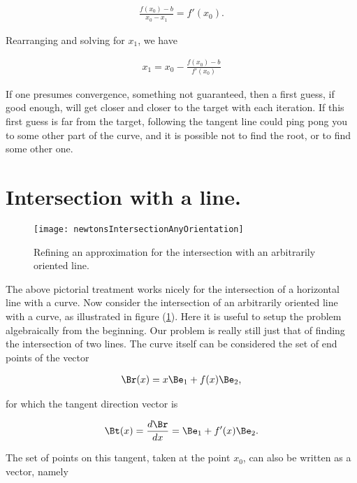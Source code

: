 \begin{align}\label{eqn:intersectionNewton:10}
\frac{f(x_0) - b}{x_0 - x_1} = f'(x_0).
\end{align}

Rearranging and solving for $x_1$, we have

\begin{align}\label{eqn:intersectionNewton:11}
x_1 = x_0 - \frac{f(x_0) - b}{f'(x_0)}
\end{align}

If one presumes convergence, something not guaranteed, then a first guess, if good enough, will get closer and closer to the target with each iteration.  If this first guess is far from the target, following the tangent line could ping pong you to some other part of the curve, and it is possible not to find the root, or to find some other one.

\section{Intersection with a line.}

\begin{figure}[htp]
\centering
\texttt{[image: newtonsIntersectionAnyOrientation]}
\caption{Refining an approximation for the intersection with an arbitrarily oriented line.}\label{fig:newtonsIntersectionAnyOrientation}
\end{figure}

The above pictorial treatment works nicely for the intersection of a horizontal line with a curve.  Now consider the intersection of an arbitrarily oriented line with a curve, as illustrated in figure (\ref{fig:newtonsIntersectionAnyOrientation}).  Here it is useful to setup the problem algebraically from the beginning.  Our problem is really still just that of finding the intersection of two lines.  The curve itself can be considered the set of end points of the vector

\begin{align}\label{eqn:intersectionNewton:20}
\Br(x) = x \Be_1 + f(x) \Be_2,
\end{align}

for which the tangent direction vector is 

\begin{align}\label{eqn:intersectionNewton:21}
\Bt(x) = \frac{d\Br}{dx} = \Be_1 + f'(x) \Be_2.
\end{align}

The set of points on this tangent, taken at the point $x_0$, can also be written as a vector, namely

